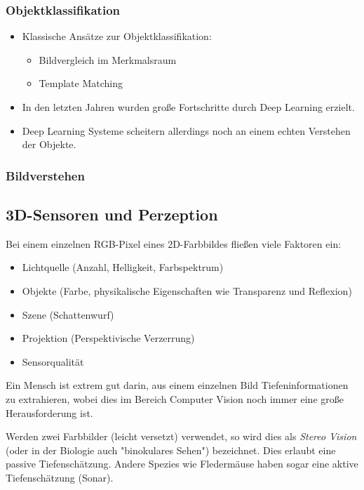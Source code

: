 \documentclass[a4paper, 11pt, accentcolor = tud3b]{tudreport}
\begin{document}
				\subsubsection{Objektklassifikation}
					\begin{itemize}
						\item Klassische Ansätze zur Objektklassifikation:
							\begin{itemize}
								\item Bildvergleich im Merkmalsraum
								\item Template Matching
							\end{itemize}
						\item In den letzten Jahren wurden große Fortschritte durch Deep Learning erzielt.
						\item Deep Learning Systeme scheitern allerdings noch an einem echten Verstehen der Objekte.
					\end{itemize}
				
				\subsubsection{Bildverstehen} %

			\subsection{3D-Sensoren und Perzeption}
				Bei einem einzelnen RGB-Pixel eines 2D-Farbbildes fließen viele Faktoren ein:
				\begin{itemize}
					\item Lichtquelle (Anzahl, Helligkeit, Farbspektrum)
					\item Objekte (Farbe, physikalische Eigenschaften wie Transparenz und Reflexion)
					\item Szene (Schattenwurf)
					\item Projektion (Perspektivische Verzerrung)
					\item Sensorqualität
				\end{itemize}
				Ein Mensch ist extrem gut darin, aus einem einzelnen Bild Tiefeninformationen zu extrahieren, wobei dies im Bereich Computer Vision noch immer eine große Herausforderung ist.
				
				Werden zwei Farbbilder (leicht versetzt) verwendet, so wird dies als \emph{Stereo Vision} (oder in der Biologie auch "binokulares Sehen") bezeichnet. Dies erlaubt eine passive Tiefenschätzung. Andere Spezies wie Fledermäuse haben sogar eine aktive Tiefenschätzung (Sonar).
				
\end{document}
